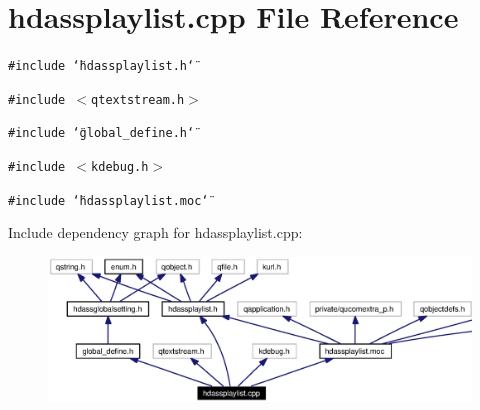 \section{hdassplaylist.cpp File Reference}
\label{hdassplaylist_8cpp}


{\tt \#include \char`\"{}hdassplaylist.h\char`\"{}}\par
{\tt \#include $<$qtextstream.h$>$}\par
{\tt \#include \char`\"{}global\_\-define.h\char`\"{}}\par
{\tt \#include $<$kdebug.h$>$}\par
{\tt \#include \char`\"{}hdassplaylist.moc\char`\"{}}\par


Include dependency graph for hdassplaylist.cpp:\begin{figure}[H]
\begin{center}
\leavevmode
\includegraphics[width=399pt]{hdassplaylist_8cpp__incl}
\end{center}
\end{figure}
